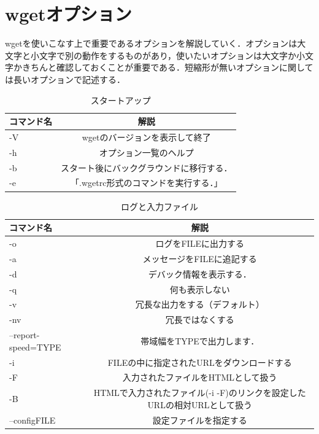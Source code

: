\section{wgetオプション}
wgetを使いこなす上で重要であるオプションを解説していく．オプションは大文字と小文字で別の動作をするものがあり，使いたいオプションは大文字か小文字かきちんと確認しておくことが重要である．短縮形が無いオプションに関しては長いオプションで記述する．

\begin{table}[H]
  \begin{center}
    \caption{スタートアップ}
    \begin{tabular}{|l|c|} \hline
      コマンド名 & 解説  \\ \hline
      -V & wgetのバージョンを表示して終了  \\
      -h & オプション一覧のヘルプ  \\
      -b & スタート後にバックグラウンドに移行する．  \\
-e & 「.wgetrc形式のコマンドを実行する．」  \\ \hline
    \end{tabular}
  \end{center}
\end{table}

\begin{table}[H]
  \begin{center}
    \caption{ログと入力ファイル}
    \begin{tabular}{|l|c|} \hline
      コマンド名 & 解説  \\ \hline
      -o & ログをFILEに出力する  \\
      -a & メッセージをFILEに追記する  \\
      -d & デバック情報を表示する．  \\
-q & 何も表示しない  \\
-v & 冗長な出力をする（デフォルト）  \\
-nv & 冗長ではなくする  \\
--report-speed=TYPE & 帯域幅をTYPEで出力します．  \\
-i & FILEの中に指定されたURLをダウンロードする  \\
-F & 入力されたファイルをHTMLとして扱う  \\
-B & HTMLで入力されたファイル(-i -F)のリンクを設定したURLの相対URLとして扱う  \\
--configFILE & 設定ファイルを指定する  \\ \hline
    \end{tabular}
  \end{center}
\end{table}

